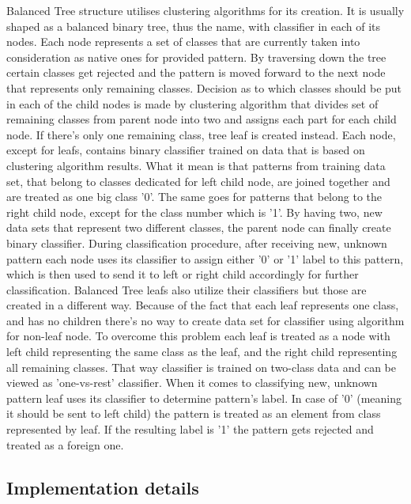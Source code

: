 Balanced Tree structure utilises clustering algorithms for its creation. It is usually shaped as a balanced binary tree, thus the name, with classifier in each of its nodes. Each node represents a set of classes that are currently taken into consideration as native ones for provided pattern. By traversing down the tree certain classes get rejected and the pattern is moved forward to the next node that represents only remaining classes. Decision as to which classes should be put in each of the child nodes is made by clustering algorithm that divides set of remaining classes from parent node into two and assigns each part for each child node. If there's only one remaining class, tree leaf is created instead. Each node, except for leafs, contains binary classifier trained on data that is based on clustering algorithm results. What it mean is that patterns from training data set, that belong to classes dedicated for left child node, are joined together and are treated as one big class '0'. The same goes for patterns that belong to the right child node, except for the class number which is '1'. By having two, new data sets that represent two different classes, the parent node can finally create binary classifier. During classification procedure, after receiving new, unknown pattern each node uses its classifier to assign either '0' or '1' label to this pattern, which is then used to send it to left or right child accordingly for further classification. Balanced Tree leafs also utilize their classifiers but those are created in a different way. Because of the fact that each leaf represents one class, and has no children there's no way to create data set for classifier using algorithm for non-leaf node. To overcome this problem each leaf is treated as a node with left child representing the same class as the leaf, and the right child representing all remaining classes. That way classifier is trained on two-class data and can be viewed as 'one-vs-rest' classifier. When it comes to classifying new, unknown pattern leaf uses its classifier to determine pattern's label. In case of '0' (meaning it should be sent to left child) the pattern is treated as an element from class represented by leaf. If the resulting label is '1' the pattern gets rejected and treated as a foreign one.

\subsection{Implementation details}

